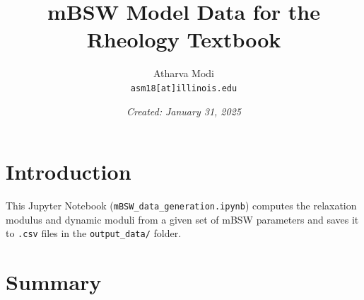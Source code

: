 \documentclass[a4paper, 12pt]{article}
\title{\textbf{mBSW Model Data for the Rheology Textbook}}
\author{Atharva Modi \\ \texttt{asm18[at]illinois.edu}}
\date{\textit{Created: January 31, 2025}}
\begin{document}
\maketitle

\section*{Introduction}

This Jupyter Notebook (\texttt{mBSW\_data\_generation.ipynb}) computes
the relaxation modulus and dynamic moduli from a given set of mBSW
parameters and saves it to \texttt{.csv} files in the
\texttt{output\_data/} folder.

\section*{Summary}
\end{document}
